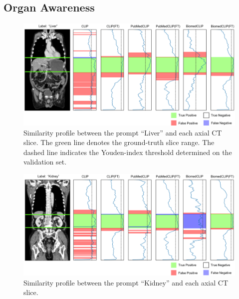 \documentclass[bioengineering,article,submit,pdftex,moreauthors]{Definitions/mdpi}
\begin{document}
\clearpage


\subsection{Organ Awareness}

\begin{figure}[ht]
  \centering
  \includegraphics[width=1\textwidth]{./figures/app_organ_aware_liver_2.png}
  \caption{Similarity profile between the prompt “Liver” and each axial CT slice. 
  The green line denotes the ground-truth slice range. 
  The dashed line indicates the Youden-index threshold determined on the validation set.}
  \label{fig:organ_aware_liver}
\end{figure}


\begin{figure}[ht]
  \centering
  \includegraphics[width=1\textwidth]{./figures/app_organ_aware_kidney_2.png}
  \caption{Similarity profile between the prompt “Kidney” and each axial CT slice.}
  \label{fig:organ_aware_kidney}
\end{figure}
\end{document}
